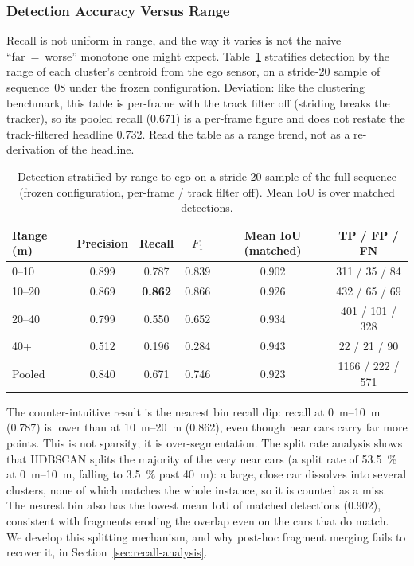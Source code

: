 \subsubsection{Detection Accuracy Versus Range}
\label{sec:results-distance}

Recall is not uniform in range, and the way it varies is not the naive
``far~=~worse'' monotone one might expect. Table~\ref{tab:distance} stratifies
detection by the range of each cluster's centroid from the ego sensor, on a
stride-20 sample of sequence~08 under the frozen configuration.
Deviation: like the clustering benchmark, this table is
per-frame with the track filter off (striding breaks the tracker), so its
pooled recall (\num{0.671}) is a per-frame figure and does not restate the
track-filtered headline \num{0.732}. Read the table as a range trend, not
as a re-derivation of the headline.

\begin{table}[H]
  \centering
  \caption[Detection stratified by range-to-ego]{Detection stratified by
    range-to-ego on a stride-20 sample of the full sequence (frozen configuration, per-frame /
    track filter off). Mean IoU is over matched detections.}
  \label{tab:distance}
  \begin{tabular}{lccccc}
    \toprule
    Range (m) & Precision & Recall & $F_1$ & Mean IoU (matched) & TP / FP / FN \\
    \midrule
    0--10   & 0.899 & 0.787 & 0.839 & 0.902 & \num{311} / \num{35}  / \num{84}  \\
    10--20  & 0.869 & \textbf{0.862} & 0.866 & 0.926 & \num{432} / \num{65}  / \num{69}  \\
    20--40  & 0.799 & 0.550 & 0.652 & 0.934 & \num{401} / \num{101} / \num{328} \\
    40+     & 0.512 & 0.196 & 0.284 & 0.943 & \num{22}  / \num{21}  / \num{90}  \\
    \midrule
    Pooled  & 0.840 & 0.671 & 0.746 & 0.923 & \num{1166} / \num{222} / \num{571} \\
    \bottomrule
  \end{tabular}
\end{table}

The counter-intuitive result is the nearest bin recall dip: recall at
\SIrange{0}{10}{\metre} (\num{0.787}) is lower than at
\SIrange{10}{20}{\metre} (\num{0.862}), even though near cars carry far more
points. This is not sparsity; it is over-segmentation. The split rate analysis shows
that HDBSCAN splits the majority of the very near cars (a split rate of
\SI{53.5}{\percent} at \SIrange{0}{10}{\metre}, falling to \SI{3.5}{\percent} past
\SI{40}{\metre}): a large, close car dissolves into several clusters,
none of which matches the whole instance, so it is counted as a miss. The nearest bin
also has the lowest mean IoU of matched detections (\num{0.902}),
consistent with fragments eroding the overlap even on the cars that do match. We
develop this splitting mechanism, and why post-hoc fragment merging fails to
recover it, in Section~\ref{sec:recall-analysis}.

